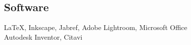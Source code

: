\begin{minipage}[t]{0.27\textwidth}
\sectionsep

\subsection{Software}
{}
\LaTeX, Inkscape, Jabref, Adobe Lightroom, Microsoft Office \\
\sectionsep
{}
Autodesk Inventor, Citavi










\end{minipage} 
\newpage
